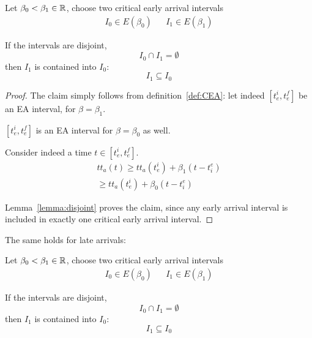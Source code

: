 \begin{lemma}
  \label{lemma:decreasing-early-int}
  Let \(\beta_0 < \beta_1 \in \mathbb{R}\),
  choose two critical early arrival intervals 
  \begin{align*}
    I_0 \in E(\beta_0) && I_1 \in E(\beta_1)
  \end{align*}
  
  If the intervals are disjoint,
  \begin{equation*}
    I_0 \cap I_1 = \emptyset
  \end{equation*}
  then \(I_1\) is contained into \(I_0\):
  \begin{equation*}
    I_1 \subseteq I_0
  \end{equation*}
\end{lemma}
\begin{proof}
  The claim simply follows from definition~\ref{def:CEA}:
  let indeed \([t_e^i, t_e^f]\) be an EA interval,
  for \(\beta = \beta_1\).

  \([t_e^i, t_e^f]\) is an EA interval for \(\beta = \beta_0\) as well.

  Consider indeed a time \(t \in [t_e^i, t_e^f]\).
  \begin{equation*}
    \begin{split}
      tt_a(t) \geq tt_a(t_e^i) + \beta_1(t - t_i^e) \\
      \geq  tt_a(t_e^i) + \beta_0(t - t_i^e)
    \end{split}
  \end{equation*}

  Lemma~\ref{lemma:disjoint} proves the claim,
  since any early arrival interval is included in exactly one critical early arrival interval.
\end{proof}

The same holds for late arrivals:

\begin{lemma}
  \label{lemma:decreasing-late-int}
  Let \(\beta_0 < \beta_1 \in \mathbb{R}\),
  choose two critical early arrival intervals 
  \begin{align*}
    I_0 \in E(\beta_0) && I_1 \in E(\beta_1)
  \end{align*}
  
  If the intervals are disjoint,
  \begin{equation*}
    I_0 \cap I_1 = \emptyset
  \end{equation*}
  then \(I_1\) is contained into \(I_0\):
  \begin{equation*}
    I_1 \subseteq I_0
  \end{equation*}
\end{lemma}

